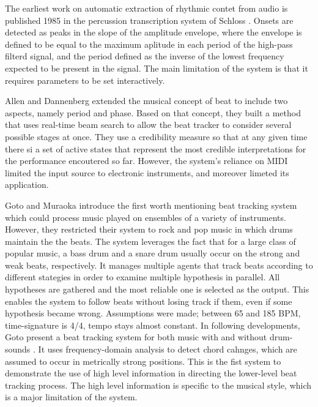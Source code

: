 \documentclass{scrartcl}
\begin{document}

The earliest work on automatic extraction of rhythmic contet from audio is published 1985 in the percussion transcription system of Schloss \cite{Schloss1985}. Onsets are detected as peaks in the slope of the amplitude envelope, where the envelope is defined to be equal to the maximum aplitude in each period of the high-pass filterd signal, and the period defined as the inverse of the lowest frequency expected to be present in the signal. The main limitation of the system is that it requires parameters to be set interactively. 

Allen and Dannenberg \cite{Allen1990} extended the musical concept of beat to include two aspects, namely period and phase. Based on that concept, they built a method that uses real-time beam search to allow the beat tracker to consider several possible stages at once. They use a credibility measure so that at any given time there si a set of active states that represent the most credible interpretations for the performance encoutered so far. However, the system's reliance on MIDI limited the input source to electronic instruments, and moreover limeted its application.

Goto and Muraoka \cite{Goto1994} introduce the first worth mentioning beat tracking system which could process music played on ensembles of a variety of instruments. However, they restricted their system to rock and pop music in which drums maintain the the beats. The system leverages the fact that for a large class of popular music, a bass drum and a snare drum usually occur on the strong and weak beats, respectively. It manages multiple agents that track beats according to different stategies in order to examine multiple hypothesis in parallel. All hypotheses are gathered and the most reliable one is selected as the output. This enables the system to follow beats without losing track if them, even if some hypothesis became wrong. Assumptions were made; between 65 and 185 BPM, time-signature is 4/4, tempo stays almost constant. In following developments, Goto present a beat tracking system for both music with and without drum-sounds \cite{Goto2001}. It uses frequency-domain analysis to detect chord cahnges, which are assumed to occur in metrically strong positions. This is the fist system to demonstrate the use of high level information in directing the lower-level beat tracking process. The high level information is specific to the musical style, which is a major limitation of the system.  
\end{document}
